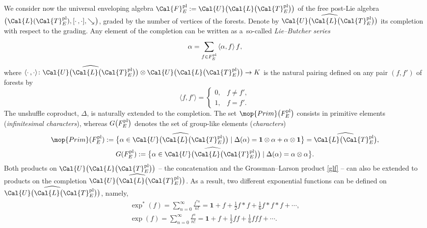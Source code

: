 \documentclass[pdftex]{sigma}
\numberwithin{equation}{section}
\begin{document}
We consider now the universal enveloping algebra $\Cal{F}^{\rm pl}_E := \Cal{U}\big(\Cal{L}\big(\Cal{T}^{\rm pl}_E\big)\big)$ of the free post-Lie algebra $\big(\Cal{L}(\Cal{T}^{\rm pl}_E), [\cdot\,,\cdot ], \searrow\! \big)$, graded by the number of vertices of the forests. Denote by $\widehat{\Cal{U}\big(\Cal{L}\big(\Cal{T}^{\rm pl}_E\big)\big)}$ its completion with respect to the grading. Any element of the completion can be written as a~so-called \textit{Lie--Butcher series} \cite{ELM2015,HA13,MKW08}
\begin{equation*}
\alpha = \sum_{f \in F^{\rm pl}_E}^{}{\left\langle \alpha, f \right\rangle f},
\end{equation*}
where $\left\langle \cdot\, , \cdot \right\rangle\! \colon \widehat{\Cal{U}\big(\Cal{L}\big(\Cal{T}^{\rm pl}_E\big)\big)} \otimes \Cal{U}\big(\Cal{L}\big(\Cal{T}^{\rm pl}_E\big)\big) \rightarrow K$ is the natural pairing defined on any pair $(f,f')$ of forests by
\begin{equation*}
\langle f , f' \rangle =
\begin{cases}
0,& f \neq f', \\ 1,& f = f'.
\end{cases}
\end{equation*}
The unshuffle coproduct, $\Delta$, is naturally extended to the completion. The set $\mop{Prim}\big(F^{\rm pl}_E\big)$ consists in primitive elements (\textit{infinitesimal characters}), whereas $G\big(F^{\rm pl}_E\big)$ denotes the set of group-like elements (\textit{characters})
\begin{gather*}
\mop{Prim}(F^{\rm pl}_E) := \big\{\alpha \in \widehat{\Cal{U}\big(\Cal{L}\big(\Cal{T}^{\rm pl}_E\big)\big)}\mid
\Delta(\alpha)
= \mathbf{1} \otimes \alpha + \alpha \otimes \mathbf{1}\big\}=\widehat{\Cal{L}\big(\Cal{T}^{\rm pl}_E\big)},
\\
G(F^{\rm pl}_E) := \big\{\alpha \in \widehat{\Cal{U}\big(\Cal{L}\big(\Cal{T}^{\rm pl}_E\big)\big)}\mid \Delta(\alpha)
= \alpha \otimes \alpha \big\}.
\end{gather*}
Both products on $\Cal{U}\big(\Cal{L}\big(\Cal{T}^{\rm pl}_E\big)\big)$ -- the concatenation and the Grossman--Larson product \eqref{glf} -- can also be extended to products on the completion $\widehat{\Cal{U}\big(\Cal{L}\big(\Cal{T}^{\rm pl}_E\big)\big)}$. As a result, two different exponential functions can be defined on $\widehat{\Cal{U}\big(\Cal{L}\big(\Cal{T}^{\rm pl}_E\big)\big)}$, namely,
\begin{gather*}
\exp^{*}(f) = \sum_{n=0}^{\infty}{\frac{f^{*n}}{n!}}
= \mathbf{1} + f + \frac{1}{2} f \ast f + \frac{1}{6} f \ast f \ast f + \cdots,
\\
\exp(f) = \sum_{n=0}^{\infty}{\frac{f^{n}}{n!}}
= \mathbf{1} + f + \frac{1}{2} f f + \frac{1}{6} f f f + \cdots.
\end{gather*}
\end{document}
